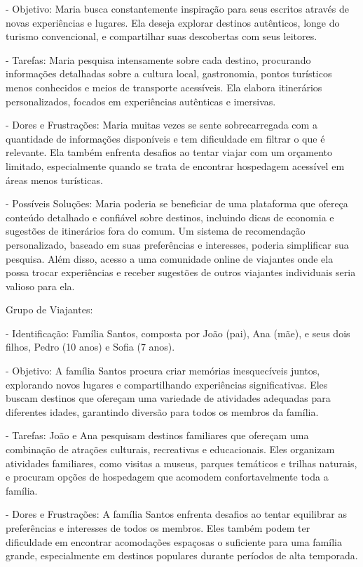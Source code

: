 \documentclass{article}
\begin{document}
- Objetivo: Maria busca constantemente inspiração para seus escritos através de novas experiências e lugares. Ela deseja explorar destinos autênticos, longe do turismo convencional, e compartilhar suas descobertas com seus leitores.

- Tarefas: Maria pesquisa intensamente sobre cada destino, procurando informações detalhadas sobre a cultura local, gastronomia, pontos turísticos menos conhecidos e meios de transporte acessíveis. Ela elabora itinerários personalizados, focados em experiências autênticas e imersivas.

- Dores e Frustrações: Maria muitas vezes se sente sobrecarregada com a quantidade de informações disponíveis e tem dificuldade em filtrar o que é relevante. Ela também enfrenta desafios ao tentar viajar com um orçamento limitado, especialmente quando se trata de encontrar hospedagem acessível em áreas menos turísticas.

- Possíveis Soluções: Maria poderia se beneficiar de uma plataforma que ofereça conteúdo detalhado e confiável sobre destinos, incluindo dicas de economia e sugestões de itinerários fora do comum. Um sistema de recomendação personalizado, baseado em suas preferências e interesses, poderia simplificar sua pesquisa. Além disso, acesso a uma comunidade online de viajantes onde ela possa trocar experiências e receber sugestões de outros viajantes individuais seria valioso para ela.

\bigskip
Grupo de Viajantes:

- Identificação: Família Santos, composta por João (pai), Ana (mãe), e seus dois filhos, Pedro (10 anos) e Sofia (7 anos).

- Objetivo: A família Santos procura criar memórias inesquecíveis juntos, explorando novos lugares e compartilhando experiências significativas. Eles buscam destinos que ofereçam uma variedade de atividades adequadas para diferentes idades, garantindo diversão para todos os membros da família.

- Tarefas: João e Ana pesquisam destinos familiares que ofereçam uma combinação de atrações culturais, recreativas e educacionais. Eles organizam atividades familiares, como visitas a museus, parques temáticos e trilhas naturais, e procuram opções de hospedagem que acomodem confortavelmente toda a família.

- Dores e Frustrações: A família Santos enfrenta desafios ao tentar equilibrar as preferências e interesses de todos os membros. Eles também podem ter dificuldade em encontrar acomodações espaçosas o suficiente para uma família grande, especialmente em destinos populares durante períodos de alta temporada.
\end{document}
